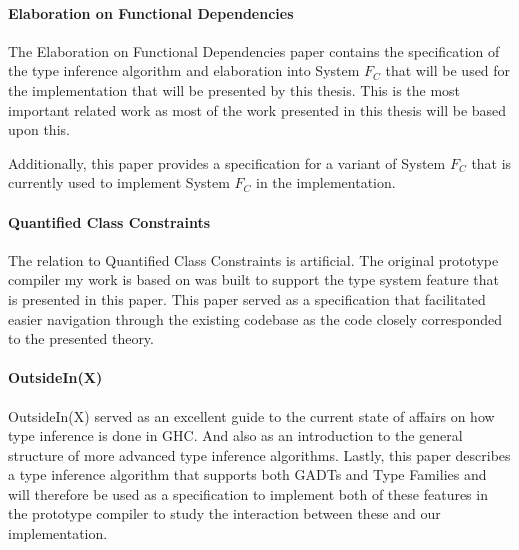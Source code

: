 \paragraph{Elaboration on Functional Dependencies}

The Elaboration on Functional
Dependencies\cite{Karachalias:2017:EFD:3156695.3122966} paper contains the
specification of the type inference algorithm and elaboration into System $F_C$
that will be used for the implementation that will be presented by this thesis.
This is the most important related work as most of the work presented in this
thesis will be based upon this.

Additionally, this paper provides a specification for a variant of System $F_C$
that is currently used to implement System $F_C$ in the implementation.

\paragraph{Quantified Class Constraints}

The relation to Quantified Class
Constraints\cite{Bottu:2017:QCC:3156695.3122967} is artificial. The original
prototype compiler my work is based on was built to support the type system
feature that is presented in this paper. This paper served as a specification
that facilitated easier navigation through the existing codebase as the code
closely corresponded to the presented theory.

\paragraph{OutsideIn(X)}

OutsideIn(X)\cite{outsideinx-modular-type-inference-with-local-assumptions}
served as an excellent guide to the current state of affairs on how type
inference is done in GHC. And also as an introduction to the general structure
of more advanced type inference algorithms. Lastly, this paper describes a type
inference algorithm that supports both GADTs and Type Families and will
therefore be used as a specification to implement both of these features in the
prototype compiler to study the interaction between these and our
implementation.
